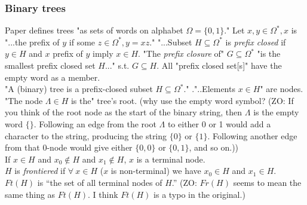 \subsubsection{Binary trees}
Paper defines trees "as sets of words on alphabet $\Omega = \{ 0,1 \}$."  Let $x,y \in \Omega^{*}, x$ is "...the prefix of $y$ if some $z \in \Omega^{*}, y = xz$."  
"...Subset $H \subseteq \Omega^{*}$ is \textit{prefix closed} if $y \in H$ and $x$ prefix of $y$ imply $x \in H$.   
"The \textit{prefix closure} of" $G \subseteq \Omega^{*}$ "is the smallest prefix closed set $H$..." s.t. $G \subseteq H$.  All "prefix closed set[s]" have the empty word as a member.\\

"A (binary) tree is a prefix-closed subset $H \subseteq \Omega^{*}$."  ."..Elements $x \in H$" are nodes.  "The node $\Lambda \in H$ is the" tree's root.  (why use the empty word symbol? (ZO: If you think of the root node as the start of the binary string, then $\Lambda$ is the empty word $\{\}$. Following an edge from the root $\Lambda$ to either 0 or 1 would add a character to the string, producing the string $\{0\}$ or $\{1\}$. Following another edge from that 0-node would give either $\{0, 0\}$ or $\{0, 1\}$, and so on.))\\
If $x \in H$ and $x_0 \notin H$ and $x_1 \notin H$, $x$ is a terminal node.\\
$H$ is \textit{frontiered} if $\forall \ x \in H$ ($x$ is non-terminal) we have $x_0 \in H$ and $x_1 \in H$. $Ft(H)$ is ``the set of all terminal nodes of $H$.'' (ZO: $Fr(H)$ seems to mean the same thing as $Ft(H)$. I think $Ft(H)$ is a typo in the original.)

